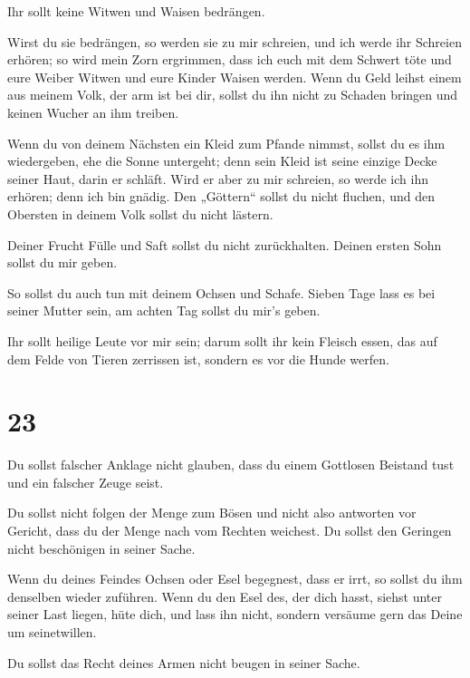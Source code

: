  Ihr sollt keine Witwen und Waisen bedrängen.

 Wirst du sie bedrängen, so werden sie zu mir schreien, und
ich werde ihr Schreien erhören;  so wird mein Zorn
ergrimmen, dass ich euch mit dem Schwert töte und eure Weiber Witwen und
eure Kinder Waisen werden.  Wenn du Geld leihst einem aus
meinem Volk, der arm ist bei dir, sollst du ihn nicht zu Schaden bringen
und keinen Wucher an ihm treiben.

 Wenn du von deinem Nächsten ein Kleid zum Pfande nimmst,
sollst du es ihm wiedergeben, ehe die Sonne untergeht; 
denn sein Kleid ist seine einzige Decke seiner Haut, darin er schläft.
Wird er aber zu mir schreien, so werde ich ihn erhören; denn ich bin
gnädig.  Den „Göttern`` sollst du nicht fluchen, und den
Obersten in deinem Volk sollst du nicht lästern.

 Deiner Frucht Fülle und Saft sollst du nicht zurückhalten.
Deinen ersten Sohn sollst du mir geben.

 So sollst du auch tun mit deinem Ochsen und Schafe. Sieben
Tage lass es bei seiner Mutter sein, am achten Tag sollst du mir's
geben.

 Ihr sollt heilige Leute vor mir sein; darum sollt ihr kein
Fleisch essen, das auf dem Felde von Tieren zerrissen ist, sondern es
vor die Hunde werfen.

\hypertarget{section-2}{%
\section{23}\label{section-2}}

 Du sollst falscher Anklage nicht glauben, dass du einem
Gottlosen Beistand tust und ein falscher Zeuge seist.

 Du sollst nicht folgen der Menge zum Bösen und nicht also
antworten vor Gericht, dass du der Menge nach vom Rechten weichest.
 Du sollst den Geringen nicht beschönigen in seiner Sache.

 Wenn du deines Feindes Ochsen oder Esel begegnest, dass er
irrt, so sollst du ihm denselben wieder zuführen.  Wenn du
den Esel des, der dich hasst, siehst unter seiner Last liegen, hüte
dich, und lass ihn nicht, sondern versäume gern das Deine um
seinetwillen.

 Du sollst das Recht deines Armen nicht beugen in seiner
Sache.

